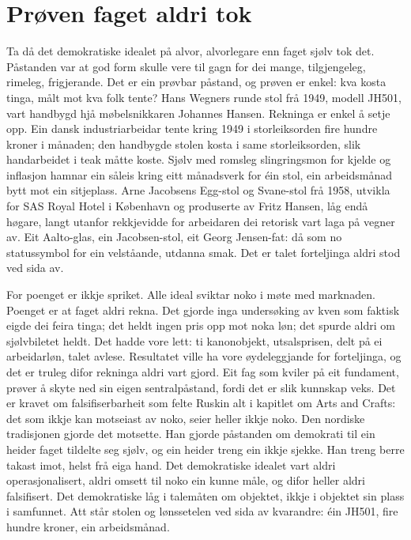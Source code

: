 \section{Prøven faget aldri tok}

Ta då det demokratiske idealet på alvor, alvorlegare enn faget sjølv tok det. Påstanden var at god form skulle vere til gagn for dei mange, tilgjengeleg, rimeleg, frigjerande. Det er ein prøvbar påstand, og prøven er enkel: kva kosta tinga, målt mot kva folk tente? Hans Wegners runde stol frå 1949, modell JH501, vart handbygd hjå møbelsnikkaren Johannes Hansen. Rekninga er enkel å setje opp. Ein dansk industriarbeidar tente kring 1949 i storleiksorden fire hundre kroner i månaden; den handbygde stolen kosta i same storleiksorden, slik handarbeidet i teak måtte koste. Sjølv med romsleg slingringsmon for kjelde og inflasjon hamnar ein såleis kring eitt månadsverk for éin stol, ein arbeidsmånad bytt mot ein sitjeplass. Arne Jacobsens Egg-stol og Svane-stol frå 1958, utvikla for SAS Royal Hotel i København og produserte av Fritz Hansen, låg endå høgare, langt utanfor rekkjevidde for arbeidaren dei retorisk vart laga på vegner av. Eit Aalto-glas, ein Jacobsen-stol, eit Georg Jensen-fat: då som no statussymbol for ein velståande, utdanna smak. Det er talet forteljinga aldri stod ved sida av.

For poenget er ikkje spriket. Alle ideal sviktar noko i møte med marknaden. Poenget er at faget aldri rekna. Det gjorde inga undersøking av kven som faktisk eigde dei feira tinga; det heldt ingen pris opp mot noka løn; det spurde aldri om sjølvbiletet heldt. Det hadde vore lett: ti kanonobjekt, utsalsprisen, delt på ei arbeidarløn, talet avlese. Resultatet ville ha vore øydeleggjande for forteljinga, og det er truleg difor rekninga aldri vart gjord. Eit fag som kviler på eit fundament, prøver å skyte ned sin eigen sentralpåstand, fordi det er slik kunnskap veks. Det er kravet om falsifiserbarheit som felte Ruskin alt i kapitlet om Arts and Crafts: det som ikkje kan motseiast av noko, seier heller ikkje noko. Den nordiske tradisjonen gjorde det motsette. Han gjorde påstanden om demokrati til ein heider faget tildelte seg sjølv, og ein heider treng ein ikkje sjekke. Han treng berre takast imot, helst frå eiga hand. Det demokratiske idealet vart aldri operasjonalisert, aldri omsett til noko ein kunne måle, og difor heller aldri falsifisert. Det demokratiske låg i talemåten om objektet, ikkje i objektet sin plass i samfunnet. Att står stolen og lønssetelen ved sida av kvarandre: éin JH501, fire hundre kroner, ein arbeidsmånad.

